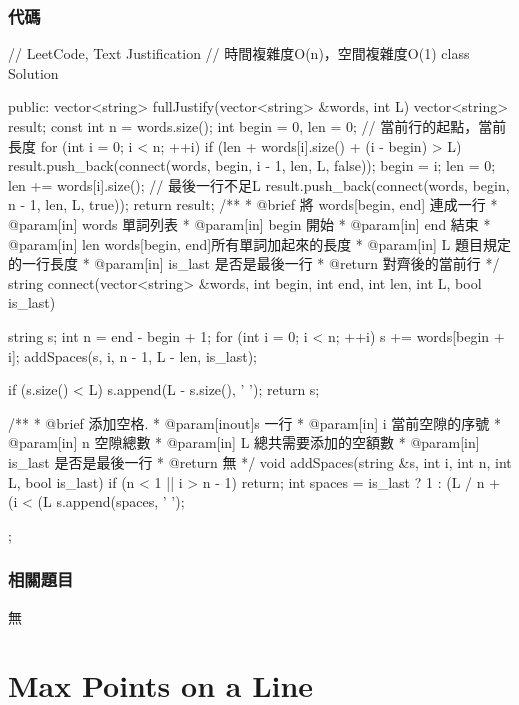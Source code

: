 \subsubsection{代碼}
\begin{Code}
// LeetCode, Text Justification
// 時間複雜度O(n)，空間複雜度O(1)
class Solution {
public:
    vector<string> fullJustify(vector<string> &words, int L) {
        vector<string> result;
        const int n = words.size();
        int begin = 0, len = 0; // 當前行的起點，當前長度
        for (int i = 0; i < n; ++i) {
            if (len + words[i].size() + (i - begin) > L) {
                result.push_back(connect(words, begin, i - 1, len, L, false));
                begin = i;
                len = 0;
            }
            len += words[i].size();
        }
        // 最後一行不足L
        result.push_back(connect(words, begin, n - 1, len, L, true));
        return result;
    }
    /**
     * @brief 將 words[begin, end] 連成一行
     * @param[in] words 單詞列表
     * @param[in] begin 開始
     * @param[in] end 結束
     * @param[in] len words[begin, end]所有單詞加起來的長度
     * @param[in] L 題目規定的一行長度
     * @param[in] is_last 是否是最後一行
     * @return 對齊後的當前行
     */
    string connect(vector<string> &words, int begin, int end,
            int len, int L, bool is_last) {
        string s;
        int n = end - begin + 1;
        for (int i = 0; i < n; ++i) {
            s += words[begin + i];
            addSpaces(s, i, n - 1, L - len, is_last);
        }

        if (s.size() < L) s.append(L - s.size(), ' ');
        return s;
    }

    /**
     * @brief 添加空格.
     * @param[inout]s 一行
     * @param[in] i 當前空隙的序號
     * @param[in] n 空隙總數
     * @param[in] L 總共需要添加的空額數
     * @param[in] is_last 是否是最後一行
     * @return 無
     */
    void addSpaces(string &s, int i, int n, int L, bool is_last) {
        if (n < 1 || i > n - 1) return;
        int spaces = is_last ? 1 : (L / n + (i < (L %
        s.append(spaces, ' ');
    }
};
\end{Code}


\subsubsection{相關題目}
\begindot
\item 無
\myenddot


\section{Max Points on a Line} %
\label{sec:max-points-on-a-line}


